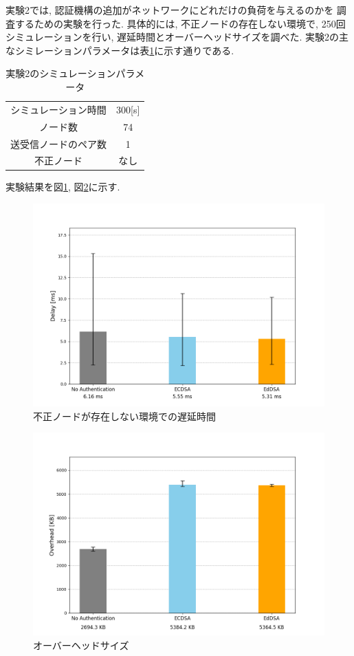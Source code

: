 実験2では, 認証機構の追加がネットワークにどれだけの負荷を与えるのかを
調査するための実験を行った. 具体的には, 
不正ノードの存在しない環境で, 250回シミュレーションを行い, 
遅延時間とオーバーヘッドサイズを調べた. 
実験2の主なシミレーションパラメータは表\ref{tab:exp2-params}に示す通りである. 
\begin{longtable}{cc}
  \caption{実験2のシミュレーションパラメータ}
  \label{tab:exp2-params}
  \endfirsthead
  \hline
  シミュレーション時間 & 300[s] \\
  ノード数 & 74 \\
  送受信ノードのペア数 & 1 \\ 
  不正ノード & なし \\ \hline
\end{longtable}
\vspace{1em}
\indent 実験結果を図\ref{fig:exp2_delay}, 図\ref{fig:exp2_overhead}に示す. \\[-2.5em]
\begin{figure}
  \centering
  \includegraphics[width=1\textwidth]{figures/exp2_delay.png}
  \caption{不正ノードが存在しない環境での遅延時間}
  \label{fig:exp2_delay}
\end{figure}
\begin{figure}
  \centering
  \includegraphics[width=1\textwidth]{figures/exp2_overhead.png}
  \caption{オーバーヘッドサイズ}
  \label{fig:exp2_overhead}
\end{figure}
